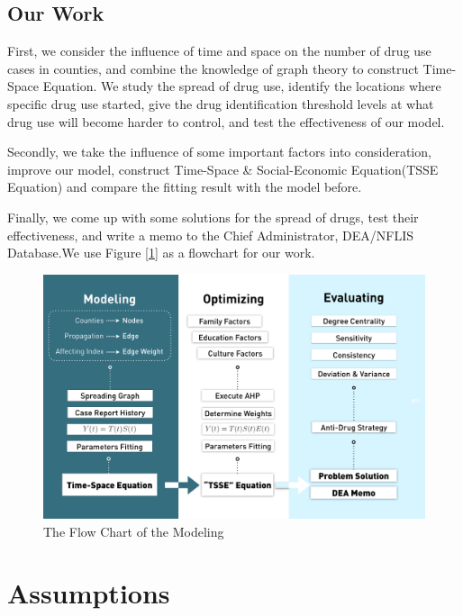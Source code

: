 \documentclass{mcmthesis}
\begin{document}
\subsection{Our Work}
First, we consider the influence of time and space on the number of drug use cases in counties, and combine the knowledge of graph theory to construct Time-Space Equation. We study the spread of drug use, identify the locations where specific drug use started, give the drug identification threshold levels at what drug use will become harder to control, and test the effectiveness of our model.

Secondly, we take the influence of some important  factors into consideration, improve our model, construct Time-Space \& Social-Economic Equation(TSSE Equation) and compare the fitting result with the model before.

Finally, we come up with some solutions for the spread of drugs, test their effectiveness, and write a memo to the Chief Administrator, DEA/NFLIS Database.We use Figure [\ref{all_flowmap}] as a flowchart for our work.
\begin{figure}[h]
	\centering
	\includegraphics[width=15cm]{figure-release/ProgressMap.png}
	\caption{The Flow Chart of the Modeling}\label{all_flowmap}
\end{figure}

\section{Assumptions}
\end{document}
